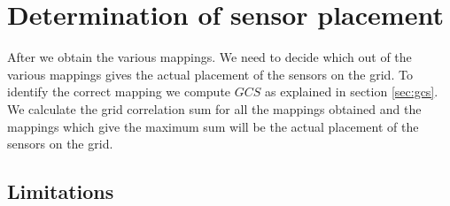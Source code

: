 %
%
%
%
%

\section{Determination of sensor placement}
\label{ref:rotationalSym}
After we obtain the various mappings. We need to decide which out of the various mappings gives the actual placement of the sensors on the grid. To identify the correct mapping we compute $GCS$ as explained in section \ref{sec:gcs}. We calculate the grid correlation sum for all the mappings obtained and the mappings which give the maximum sum will be the actual placement of the sensors on the grid. 
\subsection{Limitations}

